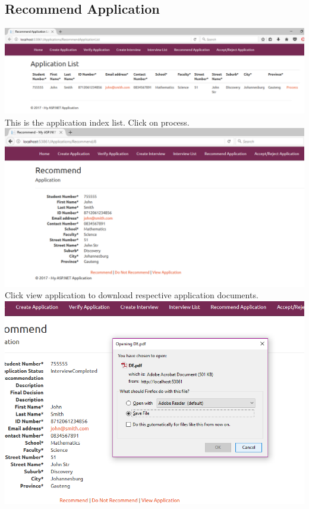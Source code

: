 \documentclass{article}
\begin{document}
\subsection{Recommend Application}
\begin{center}
\includegraphics[scale=0.45]{RecommendApplication.png}\\
This is the application index list. Click on process.\\ \bigskip
\includegraphics[scale=0.5]{RecommendApplication2.png}\\
Click view application to download respective application documents.\\ \bigskip
\includegraphics[scale=0.5]{RecommendApplication3.png}\\

\end{center}
\end{document}
